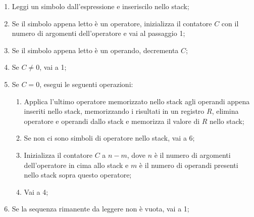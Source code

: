 \begin{enumerate}
    \item Leggi un simbolo dall'espressione e inseriscilo nello stack;
    \item Se il simbolo appena letto è un operatore, inizializza il contatore $C$ con il numero di argomenti dell'operatore e vai al passaggio 1;
    \item Se il simbolo appena letto è un operando, decrementa $C$;
    \item Se $C \neq 0$, vai a 1;
    \item Se $C = 0$, esegui le seguenti operazioni:
        \begin{enumerate}[label=(\alph*)]
            \item Applica l'ultimo operatore memorizzato nello stack agli operandi appena inseriti nello stack, memorizzando i risultati in un registro $R$, elimina operatore e operandi dallo stack e memorizza il valore di $R$ nello stack;
            \item Se non ci sono simboli di operatore nello stack, vai a 6;
            \item Inizializza il contatore $C$ a $n - m$, dove $n$ è il numero di argomenti dell'operatore in cima allo stack e $m$ è il numero di operandi presenti nello stack sopra questo operatore;
            \item Vai a 4;
        \end{enumerate}
    \item Se la sequenza rimanente da leggere non è vuota, vai a 1;
\end{enumerate}
